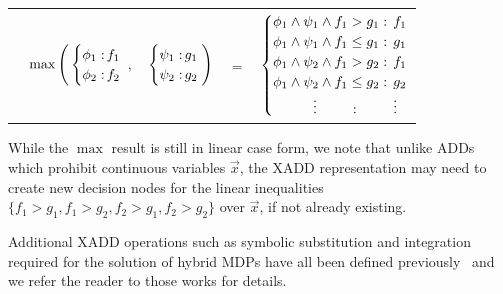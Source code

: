\vspace{-5mm}
{\footnotesize
\begin{center}
\begin{tabular}{r c c c l}
&
\hspace{-7mm} $\max \Bigg(
  \begin{cases}
    \phi_1: \hspace{-2mm} & \hspace{-1mm} f_1 \\ 
    \phi_2: \hspace{-2mm} & \hspace{-1mm} f_2 \\ 
  \end{cases}$
$,$
&
\hspace{-4mm}
  $\begin{cases}
    \psi_1: \hspace{-2mm} & \hspace{-1mm} g_1 \\ 
    \psi_2: \hspace{-2mm} & \hspace{-1mm} g_2 \\ 
  \end{cases} \Bigg)$
&
\hspace{-4mm} 
$ = $
&
\hspace{-4mm}
  $\begin{cases}
  \phi_1 \wedge \psi_1 \wedge f_1 > g_1    : & \hspace{-2mm} f_1 \\ 
  \phi_1 \wedge \psi_1 \wedge f_1 \leq g_1 : & \hspace{-2mm} g_1 \\ 
  \phi_1 \wedge \psi_2 \wedge f_1 > g_2    : & \hspace{-2mm}f_1 \\ 
  \phi_1 \wedge \psi_2 \wedge f_1 \leq g_2 : & \hspace{-2mm} g_2 \\ 
  \hspace{1cm}\vdots \hspace{8mm}: & \hspace{-2mm} \vdots
  \end{cases}$
\end{tabular}
\end{center}
\vspace{-3mm}
} While the $\max$ result is still in linear case form, we note that
unlike ADDs which prohibit continuous variables $\vec{x}$, the XADD
representation may need to create new decision nodes for the linear
inequalities $\{ f_1 > g_1, f_1 > g_2, f_2 > g_1, f_2 > g_2 \}$ over
$\vec{x}$, if not already existing.

Additional XADD operations such as symbolic substitution and
integration required for the solution of hybrid MDPs have all been
defined previously~\cite{sanner_uai11,zamani12} and we refer the
reader to those works for details.
